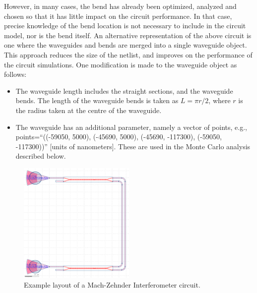 \documentclass[journal]{spie}
\begin{document}
However, in many cases, the bend has already been optimized, analyzed and chosen so that it has little impact on the circuit performance.  In that case, precise knowledge of the bend location is not necessary to include in the circuit model, nor is the bend itself.  An alternative representation of the above circuit is one where the waveguides and bends are merged into a single waveguide object.  This approach reduces the size of the netlist, and improves on the performance of the circuit simulations.  One modification is made to the waveguide object as follows:
\begin{itemize}
\item The waveguide length includes the straight sections, and the waveguide bends.  The length of the waveguide bends is taken as $L = \pi r/2$, where $r$ is the radius taken at the centre of the waveguide.
\item The waveguide has an additional parameter, namely a vector of points, e.g., points=``((-59050, 5000), (-45690, 5000), (-45690, -117300), (-59050, -117300))''  [units of nanometers].  These are used in the Monte Carlo analysis described below.
\end{itemize}



\begin{figure}[tbp]
	\centering
	\includegraphics[width=0.5\textwidth]{../figs_paper/MZI_circuit2.png}
    \caption[]{Example layout of a Mach-Zehnder Interferometer circuit.}
    \label{MZI_circuit2}
\end{figure}




\end{document}
